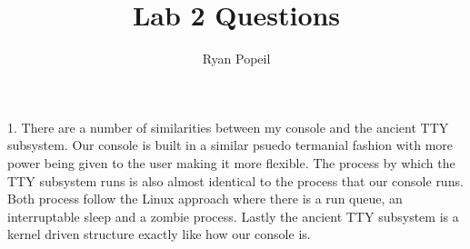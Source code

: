 \documentclass{article}
\author{Ryan Popeil}
\title{Lab 2 Questions}
\begin{document}
1. There are a number of similarities between my console and the ancient TTY subsystem.  Our console is built in a similar psuedo termanial fashion with 
more power being given to the user making it more flexible.  The process by which the TTY subsystem runs is also almost identical to the process that our console runs.
Both process follow the Linux approach where there is a run queue, an interruptable sleep and a zombie process.  Lastly the ancient TTY subsystem is a kernel driven
structure exactly like how our console is.  
\end{document}
